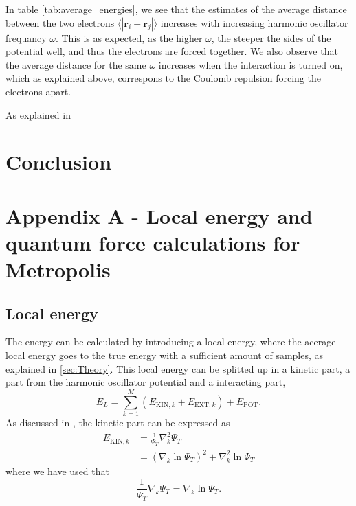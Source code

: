 \documentclass[norsk,a4paper,12pt]{article}
\begin{document}
In table \ref{tab:average_energies}, we see that the estimates of the average distance between the two electrons $\langle |\boldsymbol{r}_i-\boldsymbol{r}_j|\rangle$ increases with increasing harmonic oscillator frequancy $\omega$. This is as expected, as the higher $\omega$, the steeper the sides of the potential well, and thus the electrons are forced together. We also observe that the average distance for the same $\omega$ increases when the interaction is turned on, which as explained above, correspons to the Coulomb repulsion forcing the electrons apart.
\par 
\vspace{3mm}

As explained in 

\section{Conclusion} \label{sec:Conclusion} 


\newpage

\section{Appendix A - Local energy and quantum force calculations for Metropolis} \label{sec:appendix_A}

\subsection{Local energy}

The energy can be calculated by introducing a local energy, where the acerage local energy goes to the true energy with a sufficient amount of samples, as explained in \ref{sec:Theory}. This local energy can be splitted up in a kinetic part, a part from the harmonic oscillator potential and a interacting part,
\begin{equation}
E_L=\sum_{k=1}^{M}(E_{\text{KIN},k} + E_{\text{EXT},k})+E_{\text{POT}}.
\end{equation}
As discussed in \cite{Nordhagen}, the kinetic part can be expressed as
\begin{align}
E_{\text{KIN},k}&=\frac{1}{\Psi_T}\nabla_k^2\Psi_T\\
&=(\nabla_k\ln\Psi_T)^2+\nabla_k^2\ln\Psi_T
\end{align}
where we have used that
\begin{equation}
\frac{1}{\Psi_T}\nabla_k\Psi_T=\nabla_k\ln\Psi_T.
\end{equation}
\end{document}
